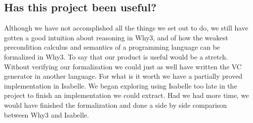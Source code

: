 \subsection{Has this project been useful?}
Although we have not accomplished all the things we set out to do, we still have gotten a good intuition about  reasoning in Why3, and of how the weakest precondition calculus and semantics of a programming language can be formalized in Why3.
To say that our product is useful would be a stretch. Without verifying our formalization we could just as well have written the VC generator in another language.
For what is it worth we have a partially proved implementation in Isabelle.
We began exploring using Isabelle too late in the project to finish an implementation we could extract.
Had we had more time, we would have finished the formalization and done a side by side comparison between Why3 and Isabelle.
